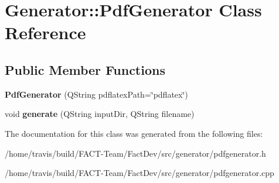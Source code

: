 \hypertarget{classGenerator_1_1PdfGenerator}{\section{Generator\-:\-:Pdf\-Generator Class Reference}
\label{classGenerator_1_1PdfGenerator}
}
\subsection*{Public Member Functions}
\begin{DoxyCompactItemize}
\item 
\hypertarget{classGenerator_1_1PdfGenerator_a59ca8292d423302478f7f278034f7006}{{\bfseries Pdf\-Generator} (Q\-String pdflatex\-Path=\char`\"{}pdflatex\char`\"{})}\label{classGenerator_1_1PdfGenerator_a59ca8292d423302478f7f278034f7006}

\item 
\hypertarget{classGenerator_1_1PdfGenerator_a2fcb924e15c201474e0071f81541b0ae}{void {\bfseries generate} (Q\-String input\-Dir, Q\-String filename)}\label{classGenerator_1_1PdfGenerator_a2fcb924e15c201474e0071f81541b0ae}

\end{DoxyCompactItemize}


The documentation for this class was generated from the following files\-:\begin{DoxyCompactItemize}
\item 
/home/travis/build/\-F\-A\-C\-T-\/\-Team/\-Fact\-Dev/src/generator/pdfgenerator.\-h\item 
/home/travis/build/\-F\-A\-C\-T-\/\-Team/\-Fact\-Dev/src/generator/pdfgenerator.\-cpp\end{DoxyCompactItemize}

